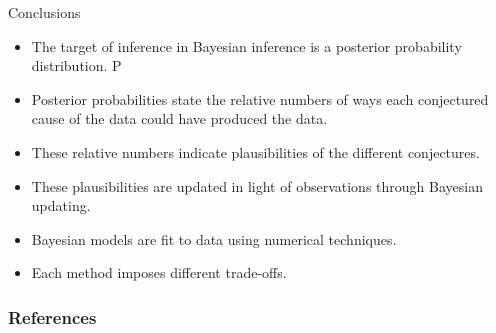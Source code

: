 \documentclass[handout]{beamer}
\begin{document}
\begin{frame}{Conclusions}
\scriptsize{

\begin{itemize}
\item The target of inference in Bayesian inference is a posterior probability distribution. P\item Posterior probabilities state the relative numbers of ways each conjectured cause of the data could have produced the data. 
\item These relative numbers indicate plausibilities of the different conjectures.
\item These plausibilities are updated in light of observations through Bayesian updating.
\item Bayesian models are fit to data using numerical techniques.
\item Each method imposes different trade-offs.

\end{itemize}


} 
\end{frame}


\begin{frame}[allowframebreaks]\scriptsize
\frametitle{References}


%
\end{frame}  









\end{document}
